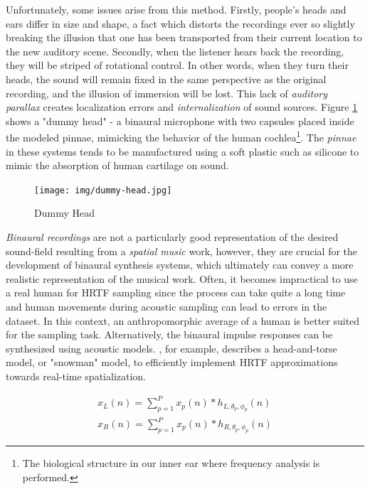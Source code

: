 Unfortunately, some issues arise from this method. Firstly, people's heads and ears differ in size and shape, a fact which distorts the recordings ever so slightly breaking the illusion that one has been transported from their current location to the new auditory scene. Secondly, when the listener hears back the recording, they will be striped of rotational control. In other words, when they turn their heads, the sound will remain fixed in the same perspective as the original recording, and the illusion of immersion will be lost. This lack of \textit{auditory parallax} creates localization errors and \textit{internalization} of sound sources. Figure \ref{fig:dummy-head} shows a "dummy head" - a binaural microphone with two capsules placed inside the modeled pinnae, mimicking the behavior of the human cochlea\footnote{The biological structure in our inner ear where frequency analysis is performed.}. The \textit{pinnae} in these systems tends to be manufactured using a soft plastic such as silicone to mimic the absorption of human cartilage on sound.

\begin{figure}[ht!]%
\centering
\texttt{[image: img/dummy-head.jpg]} 
\label{fig:dummy-head}
\caption{Dummy Head \cite{FileGeor45online}}
\end{figure}

\textit{Binaural recordings} are not a particularly good representation of the desired sound-field resulting from a \textit{spatial music} work, however, they are crucial for the development of binaural synthesis systems, which ultimately can convey a more realistic representation of the musical work. Often, it becomes impractical to use a real human for HRTF sampling since the process can take quite a long time and human movements during acoustic sampling can lead to errors in the dataset. In this context, an anthropomorphic average of a human is better suited for the sampling task. Alternatively, the binaural impulse responses can be synthesized using acoustic models. \cite{algazi2002use}, for example, describes a head-and-torse model, or "snowman" model, to efficiently implement HRTF approximations towards real-time spatialization. 

\begin{equation} \label{eq:conv-hrir}
\begin{array}{l}
x_{L}(n)=\sum_{p=1}^{P} x_{p}(n) * h_{L, \theta_{p}, \phi_{p}}(n) \\
x_{R}(n)=\sum_{p=1}^{P} x_{p}(n) * h_{R, \theta_{p}, \phi_{p}}(n)
\end{array}
\end{equation}

